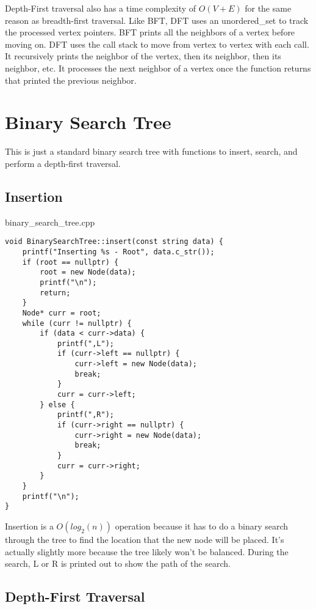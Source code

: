 \documentclass[letterpaper, 10pt,DIV=13]{scrartcl}
\numberwithin{equation}{section} %
\numberwithin{figure}{section} %
\numberwithin{table}{section} %
\begin{document}
Depth-First traversal also has a time complexity of $O(V + E)$ for the same reason as breadth-first
traversal. Like BFT, DFT uses an unordered\_set to track the processed vertex pointers. BFT prints all the
neighbors of a vertex before moving on. DFT uses the call stack to move from vertex to vertex with each
call. It recursively prints the neighbor of the vertex, then its neighbor, then its neighbor, etc. It
processes the next neighbor of a vertex once the function returns that printed the previous neighbor.

\section{Binary Search Tree}
This is just a standard binary search tree with functions to insert, search, and perform a depth-first
traversal.

\subsection{Insertion}

binary\_search\_tree.cpp
\begin{verbatim}
void BinarySearchTree::insert(const string data) {
    printf("Inserting %s - Root", data.c_str());
    if (root == nullptr) {
        root = new Node(data);
        printf("\n");
        return;
    }
    Node* curr = root;
    while (curr != nullptr) {
        if (data < curr->data) {
            printf(",L");
            if (curr->left == nullptr) {
                curr->left = new Node(data);
                break;
            }
            curr = curr->left;
        } else {
            printf(",R");
            if (curr->right == nullptr) {
                curr->right = new Node(data);
                break;
            }
            curr = curr->right;
        }
    }
    printf("\n");
}
\end{verbatim}

Insertion is a $O(log_2(n))$ operation because it has to do a binary search through the tree to find the
location that the new node will be placed. It's actually slightly more because the tree likely won't be balanced. During the search, L or R is printed out to show the path of the search.

\subsection{Depth-First Traversal}
\end{document}
